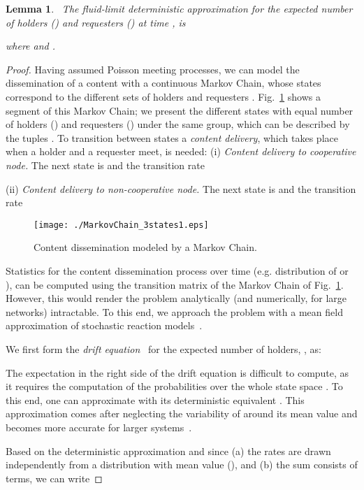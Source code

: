 \documentclass[10pt,conference,letterpaper]{IEEEtran}
\newtheorem{lemma}{Lemma}
\begin{document}
\begin{lemma}~\label{thm:ODEs}
The fluid-limit deterministic approximation for the expected number of holders () and requesters () at time , is

where  and .
\end{lemma}
\begin{proof} Having assumed Poisson meeting processes, we can model the dissemination of a content with a continuous Markov Chain, whose states correspond to the different sets of holders and requesters . Fig.~\ref{fig:markov-chain} shows a segment of this Markov Chain; we present the different states with equal number of holders () and requesters () under the same group, which can be described by the tuples . To transition between states a \textit{content delivery}, which takes place when a holder  and a requester  meet, is needed:
(i) \textit{Content delivery to cooperative node.} The next state is  and the transition rate

(ii) \textit{Content delivery to non-cooperative node.} The next state is  and the transition rate


\begin{figure}
\texttt{[image: ./MarkovChain\_3states1.eps]}\caption{Content dissemination modeled by a Markov Chain.}
\label{fig:markov-chain}
\end{figure}



Statistics for the content dissemination process over time (e.g. distribution of  or ), can be computed using the transition matrix of the Markov Chain of Fig.~\ref{fig:markov-chain}. However, this would render the problem analytically (and numerically, for large networks) intractable. To this end, we approach the problem with a mean field approximation of stochastic reaction models~\cite{mean-field-toolbox}.

We first form the \textit{drift equation}~\cite[Theorem~1.4.1]{mean-field-toolbox} for the expected number of holders, , as:
 
The expectation in the right side of the drift equation is difficult to compute, as it requires the computation of the probabilities over the whole state space . To this end, one can approximate  with its deterministic equivalent . This approximation comes after neglecting the variability of  around its mean value and becomes more accurate for larger systems~\cite[Section~1.5]{mean-field-toolbox}.


Based on the deterministic approximation and since (a) the rates  are drawn independently from a distribution  with mean value  (), and (b) the sum  consists of  terms, we can write


\end{proof}
\end{document}
